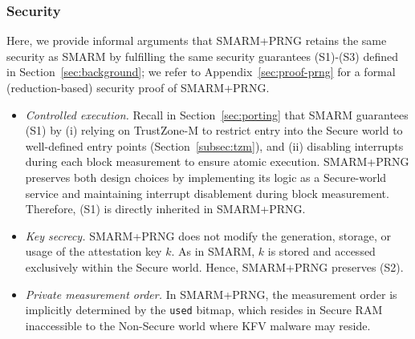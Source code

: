 \documentclass{ieeeaccess}
\newcommand{\rtsmarmone}{SMARM+PRNG\xspace}
\begin{document}
\subsubsection{Security}
Here, we provide informal arguments that \rtsmarmone retains the same security as SMARM by fulfilling the same security guarantees (S1)-(S3) defined in Section~\ref{sec:background}; we refer to Appendix~\ref{sec:proof-prng} for a formal (reduction-based) security proof of \rtsmarmone.

\begin{itemize}
  \item[(S1)] \emph{Controlled execution.}
  Recall in Section~\ref{sec:porting} that SMARM guarantees (S1) by (i) relying on TrustZone-M to restrict entry into the Secure world to well-defined entry points (Section~\ref{subsec:tzm}), and (ii) disabling interrupts during each block measurement to ensure atomic execution.
  \rtsmarmone preserves both design choices by implementing its logic as a Secure-world service and maintaining interrupt disablement during block measurement.
  Therefore, (S1) is directly inherited in \rtsmarmone.

  \item[(S2)] \emph{Key secrecy.}
  \rtsmarmone does not modify the generation, storage, or usage of the attestation key $k$.
  As in SMARM, $k$ is stored and accessed exclusively within the Secure world.
  Hence, \rtsmarmone preserves (S2).

  \item[(S3)] \emph{Private measurement order.}
  In \rtsmarmone, the measurement order is implicitly determined by the \texttt{used} bitmap, which resides in Secure RAM inaccessible to the Non-Secure world where KFV malware may reside.
\end{itemize}
\end{document}
